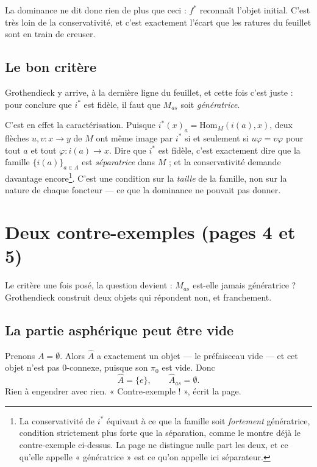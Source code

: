 \documentclass[11pt,a4paper]{article}
\begin{document}
La dominance ne dit donc rien de plus que ceci : $f^{*}$ reconnaît l'objet
initial. C'est très loin de la conservativité, et c'est exactement l'écart que
les ratures du feuillet sont en train de creuser.

\subsection*{Le bon critère}

Grothendieck y arrive, à la dernière ligne du feuillet, et cette fois c'est
juste : pour conclure que $i^{*}$ est fidèle, il faut que $M_{as}$ soit
\emph{génératrice}.

C'est en effet la caractérisation. Puisque $i^{*}(x)_{a} =
\mathrm{Hom}_{M}(i(a), x)$, deux flèches $u, v : x \to y$ de $M$ ont même image
par $i^{*}$ si et seulement si $u\varphi = v\varphi$ pour tout $a$ et tout
$\varphi : i(a) \to x$. Dire que $i^{*}$ est fidèle, c'est exactement dire que
la famille $\{i(a)\}_{a \in A}$ est \emph{séparatrice} dans $M$ ; et la
conservativité demande davantage encore\footnote{La conservativité de $i^{*}$
équivaut à ce que la famille soit \emph{fortement} génératrice, condition
strictement plus forte que la séparation, comme le montre déjà le
contre-exemple ci-dessus. La page ne distingue nulle part les deux, et ce qu'elle
appelle « génératrice » est ce qu'on appelle ici séparateur.}. C'est une
condition sur la \emph{taille} de la famille, non sur la nature de chaque
foncteur — ce que la dominance ne pouvait pas donner.

\section*{Deux contre-exemples (pages 4 et 5)}

Le critère une fois posé, la question devient : $M_{as}$ est-elle jamais
génératrice ? Grothendieck construit deux objets qui répondent non, et
franchement.

\subsection*{La partie asphérique peut être vide}

Prenons $A = \emptyset$. Alors $\hat{A}$ a exactement un objet — le préfaisceau
vide — et cet objet n'est pas $0$-connexe, puisque son $\pi_{0}$ est vide. Donc
\[
\hat{A} = \{e\}, \qquad \hat{A}_{as} = \emptyset.
\]
Rien à engendrer avec rien. « Contre-exemple ! », écrit la page.
\end{document}
